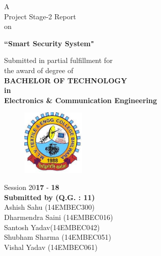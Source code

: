 \documentclass[twoside,a4paper,16pt]{book}
\begin{document}
	
	
	
	\frontmatter
	\thispagestyle{empty}
	
	
	
	
	\begin{center}
		{\Large A \\ Project Stage-2 Report\\ on \\
			\vspace{0.5cm}
			
			{\bf ``Smart Security System"}}
	\end{center}
	
	\vspace{0.3cm}
	\begin{center}
		\Large Submitted in partial fulfillment for \\\vspace{0.5cm} the award of degree of\\\vspace{0.5cm}
		{\bf  BACHELOR OF TECHNOLOGY\\\vspace{0.5cm}in\\\vspace{0.5cm}Electronics \& Communication Engineering}
	\end{center}
	\vspace{0.6cm}
	
	\begin{figure}[ht!]
		\begin{center}
			\includegraphics[width=3.0cm]{logo.jpg}
		\end{center}
	\end{figure}
	
	\vspace{0.2cm}
	
	\begin{center}
		\large Session 20{\bf17} - {\bf18}\\\vspace{0.5cm}
		{\bf Submitted by (Q.G. : 11)}\\
		{\large	\hspace{-0.1cm}Ashish Sahu (14EMBEC300)\\\hspace{0.8cm}
			Dharmendra Saini (14EMBEC016)\\\hspace{0.2cm}Santosh Yadav(14EMBEC042)\\\hspace{0.9cm}Shubham Sharma (14EMBEC051)\\\hspace{0.1cm}Vishal Yadav (14EMBEC061)}
			\end{center}
	
\end{document}
